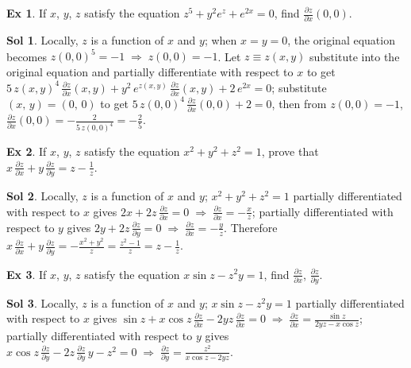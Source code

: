 \documentclass[12pt]{extarticle}
\newcommand{\ds}{\displaystyle}
\newcommand{\ie}{\;\Longrightarrow\;}
\theoremstyle{definition}
\newtheorem*{ex}{Ex}
\newtheorem*{sol}{Sol}
\newcommand{\pdiff}[2]{\frac{\partial #1}{\partial #2}}
\begin{document}
\begin{ex} 
  If $x$, $y$, $z$ satisfy the equation $\ds z^5 + y^2 e^z + e^{2x} = 0$, find $\ds\pdiff{z}{x}(0, 0)$. 
\end{ex}
\begin{sol}
  Locally, $z$ is a function of $x$ and $y$; when $x = y = 0$, the original equation becomes $\ds z(0, 0)^5 = -1\ie z(0, 0) = -1$. Let $z\equiv z(x, y)$ substitute into the original equation and partially differentiate with respect to $x$ to get $\ds 5\,z(x, y)^4\,\pdiff{z}{x}(x, y) + y^2\,e^{z(x, y)}\,\pdiff{z}{x}(x,y) + 2\,e^{2x} = 0$; substitute $(x,\,y) = (0,\,0)$ to get $\ds 5\,z(0, 0)^4\,\pdiff{z}{x}(0, 0) + 2  = 0$, then from $z(0, 0) = -1$, $\ds\pdiff{z}{x}(0, 0) = -\frac{2}{5\,z(0, 0)^4} = -\frac{2}{5}$. 
\end{sol}

\begin{ex}
  If $x$, $y$, $z$ satisfy the equation $\ds x^2 + y^2 + z^2 = 1$, prove that $\ds x\,\pdiff{z}{x} + y\,\pdiff{z}{y} = z - \frac{1}{z}$. 
\end{ex}

\begin{sol}
  Locally, $z$ is a function of $x$ and $y$; $\ds x^2 + y^2 + z^2 = 1$ partially differentiated with respect to $x$ gives $\ds 2x + 2z\,\pdiff{z}{x} = 0 \ie \pdiff{z}{x} = -\frac{x}{z}$; partially differentiated with respect to $y$ gives $\ds 2y + 2z\,\pdiff{z}{y} = 0 \ie \pdiff{z}{x} = -\frac{y}{z}$. Therefore $\ds x\,\pdiff{z}{x} + y\,\pdiff{z}{y} = -\frac{x^2 + y^2}{z} = \frac{z^2 - 1}{z} = z - \frac{1}{z}$. 
\end{sol}

\begin{ex}
  If $x$, $y$, $z$ satisfy the equation $\ds x\sin z - z^2 y = 1$, find $\ds\pdiff{z}{x}$, $\ds\pdiff{z}{y}$. 
\end{ex}

\begin{sol}
  Locally, $z$ is a function of $x$ and $y$; $\ds x\sin z - z^2 y = 1$ partially differentiated with respect to $x$ gives $\ds\sin z + x\cos z\,\pdiff{z}{x} - 2yz\,\pdiff{z}{x} = 0 \ie \pdiff{z}{x} = \frac{\sin z}{2yz - x\cos z}$; partially differentiated with respect to $y$ gives $\ds x\cos z\,\pdiff{z}{y} - 2z\,\pdiff{z}{y}\,y - z^2 = 0 \ie \pdiff{z}{y} = \frac{z^2}{x\cos z - 2yz}$. 
\end{sol}
\end{document}
